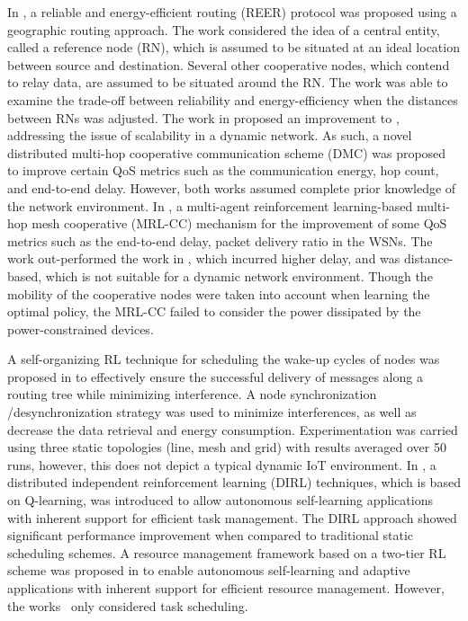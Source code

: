 \documentclass[journal]{IEEEtran}
\begin{document}
In \cite{Chen2008}, a reliable and energy-efficient routing (REER) protocol was proposed using a geographic routing approach. The work considered the idea of a central entity, called a reference node (RN), which is assumed to be situated at an ideal location between source and destination. Several other cooperative nodes, which contend to relay data, are assumed to be situated around the RN. The work was able to examine the trade-off between reliability and energy-efficiency when the distances between RNs was adjusted. The work in \cite{Chen2011} proposed an improvement to \cite{Chen2008}, addressing the issue of scalability in a dynamic network. As such, a novel distributed multi-hop cooperative communication scheme (DMC) was proposed to improve certain QoS metrics such as the communication energy, hop count, and end-to-end delay. However, both works assumed complete prior knowledge of the network environment.
In \cite{Liang2009}, a multi-agent reinforcement learning-based multi-hop mesh cooperative (MRL-CC) mechanism for the improvement of some QoS metrics such as the end-to-end delay, packet delivery ratio in the WSNs. The work out-performed the work in \cite{Chen2009}, which incurred higher delay, and was distance-based, which is not suitable for a dynamic network environment. Though the mobility of the cooperative nodes were taken into account when learning the optimal policy, the MRL-CC failed to consider the power dissipated by the power-constrained devices.

A self-organizing RL technique for scheduling the wake-up cycles of nodes was proposed in \cite{Mihaylov} to effectively ensure the successful delivery of messages along a routing tree while minimizing interference. A node synchronization /desynchronization strategy was used to minimize interferences, as well as decrease the data retrieval and energy consumption. Experimentation was carried using three static topologies (line, mesh and grid) with results averaged over 50 runs, however, this does not depict a typical dynamic IoT environment. In \cite{Shah2007}, a distributed independent reinforcement learning (DIRL) techniques, which is based on Q-learning, was introduced to allow autonomous self-learning applications with inherent support for efficient task management. The DIRL approach showed significant performance improvement when compared to traditional static scheduling schemes. A resource management framework based on a two-tier RL scheme was proposed in \cite{Shah2013} to enable autonomous self-learning and adaptive applications with inherent support for efficient resource management. However, the works~\cite{Shah2007, Shah2013} only considered task scheduling.
\end{document}
